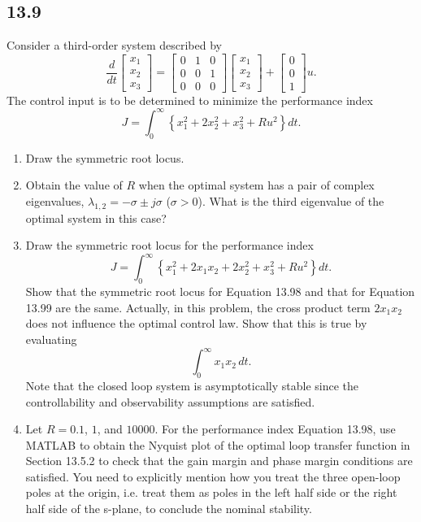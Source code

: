 \documentclass{article}
\newcommand{\problem}[2]{\subsection*{#1}}
\begin{document}
\problem{13.9}{}
Consider a third-order system described by
\[
\frac{d}{dt}\begin{bmatrix} x_1 \\ x_2 \\ x_3 \end{bmatrix} =
\begin{bmatrix} 0 & 1 & 0 \\ 0 & 0 & 1 \\ 0 & 0 & 0 \end{bmatrix}
\begin{bmatrix} x_1 \\ x_2 \\ x_3 \end{bmatrix} +
\begin{bmatrix} 0 \\ 0 \\ 1 \end{bmatrix} u.
\]
The control input is to be determined to minimize the performance index
\[
J = \int_0^{\infty} \left\{x_1^2 + 2x_2^2 + x_3^2 + Ru^2\right\} dt. \tag{13.98}
\]
\begin{enumerate}
\item Draw the symmetric root locus.
\item Obtain the value of $R$ when the optimal system has a pair of complex eigenvalues, $\lambda_{1,2} = -\sigma \pm j\sigma$ ($\sigma > 0$). What is the third eigenvalue of the optimal system in this case?
\item Draw the symmetric root locus for the performance index
\[
J = \int_0^{\infty} \left\{x_1^2 + 2x_1x_2 + 2x_2^2 + x_3^2 + Ru^2\right\} dt. \tag{13.99}
\]
Show that the symmetric root locus for Equation 13.98 and that for Equation 13.99 are the same. Actually, in this problem, the cross product term $2x_1x_2$ does not influence the optimal control law. Show that this is true by evaluating
\[
\int_0^{\infty} x_1x_2\,dt.
\]
Note that the closed loop system is asymptotically stable since the controllability and observability assumptions are satisfied.
\item Let $R = 0.1$, $1$, and $10000$. For the performance index Equation 13.98, use MATLAB to obtain the Nyquist plot of the optimal loop transfer function in Section 13.5.2 to check that the gain margin and phase margin conditions are satisfied. You need to explicitly mention how you treat the three open-loop poles at the origin, i.e. treat them as poles in the left half side or the right half side of the s-plane, to conclude the nominal stability.
\end{enumerate}
\end{document}
